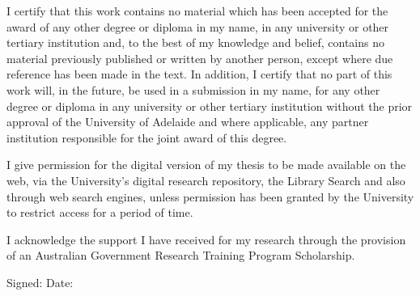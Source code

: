 {%
%
%
I certify that this work contains no material which has been accepted for the award of any other degree or diploma in my name, in any university or other tertiary institution and, to the best of my knowledge and belief, contains no material previously published or written by another person, except where due reference has been made in the text. In addition, I certify that no part of this work will, in the future, be used in a submission in my name, for any other degree or diploma in any university or other tertiary institution without the prior approval of the University of Adelaide and where applicable, any partner institution responsible for the joint award of this degree.

I give permission for the digital version of my thesis to be made available on the web, via the University's digital research repository, the Library Search and also through web search engines, unless permission has been granted by the University to restrict access for a period of time.

I acknowledge the support I have received for my research through the provision of an Australian Government Research Training Program Scholarship. 

Signed: \dotfill\quad 
Date: \dotfill

}